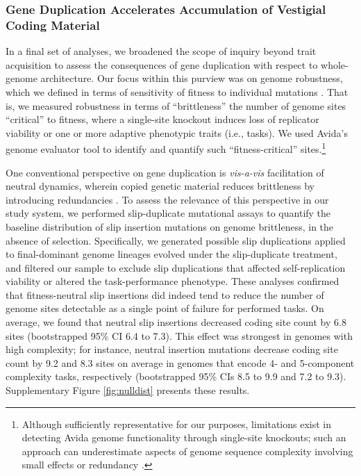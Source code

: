 \subsubsection{Gene Duplication Accelerates Accumulation of Vestigial Coding Material}



In a final set of analyses, we broadened the scope of inquiry beyond trait acquisition to assess the consequences of gene duplication with respect to whole-genome architecture.
Our focus within this purview was on genome robustness, which we defined in terms of sensitivity of fitness to individual mutations \citep{lenski1999genome}.
That is, we measured robustness in terms of ``brittleness'' the number of genome sites ``critical'' to fitness, where a single-site knockout induces loss of replicator viability or one or more adaptive phenotypic traits (i.e., tasks).
We used Avida's genome evaluator tool to identify and quantify such ``fitness-critical'' sites.\footnote{%
Although sufficiently representative for our purposes, limitations exist in detecting Avida genome functionality through single-site knockouts; such an approach can underestimate aspects of genome sequence complexity involving small effects or redundancy \citep{lenski1999genome,moreno2024cryptic}.
}

One conventional perspective on gene duplication is \textit{vis-a-vis} facilitation of neutral dynamics, wherein copied genetic material reduces brittleness by introducing redundancies \citep{wagner1996genetic}.
To assess the relevance of this perspective in our study system, we performed slip-duplicate mutational assays to quantify the baseline distribution of slip insertion mutations on genome brittleness, in the absence of selection.
Specifically, we generated possible slip duplications applied to final-dominant genome lineages evolved under the slip-duplicate treatment, and filtered our sample to exclude slip duplications that affected self-replication viability or altered the task-performance phenotype.
These analyses confirmed that fitness-neutral slip insertions did indeed tend to reduce the number of genome sites detectable as a single point of failure for performed tasks.
On average, we found that neutral slip insertions decreased coding site count by 6.8 sites (bootstrapped 95\% CI 6.4 to 7.3).
This effect was strongest in genomes with high complexity; for instance, neutral insertion mutations decrease coding site count by 9.2 and 8.3 sites on average in genomes that encode 4- and 5-component complexity tasks, respectively (bootstrapped 95\% CIs 8.5 to 9.9 and 7.2 to 9.3).
Supplementary Figure \ref{fig:nulldist} presents these results.

